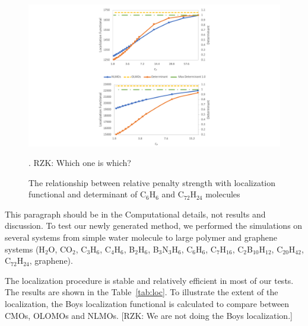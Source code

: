 \documentclass[aps,prl,reprint,amsmath,amssymb]{revtex4-1}
\begin{document}
\begin{figure}[htbp]
\includegraphics[scale=0.6]{figure_2.pdf} 
  \caption{The relationship between relative penalty strength with localization functional and determinant of C$_6$H$_6$ and C$_{72}$H$_{24}$ molecules}. RZK: Which one is which?
\end{figure}

This paragraph should be in the Computational details, not results and discussion. To test our newly generated method, we performed the simulations on several systems from simple water molecule to large polymer and graphene systems (H$_2$O, CO$_2$, C$_3$H$_6$, C$_4$H$_6$, B$_2$H$_6$, B$_3$N$_3$H$_6$, C$_6$H$_6$, C$_7$H$_{16}$, C$_2$B$_{10}$H$_{12}$, C$_{20}$H$_{42}$, C$_{72}$H$_{24}$, graphene). %


The localization procedure is stable and relatively efficient in most of our tests.
The results are shown in the Table~\ref{tab:loc}.
To illustrate the extent of the localization, the Boys localization functional is calculated to compare between CMOs, OLOMOs and NLMOs. [RZK: We are not doing the Boys localization.]
\end{document}
